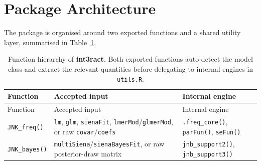 \documentclass[
  letterpaper,
  DIV=11,
  numbers=noendperiod]{scrartcl}
\begin{document}
\section{Package Architecture}\label{sec-package}

The package is organised around two exported functions and a shared
utility layer, summarised in Table~\ref{tbl-hierarchy}.

\begin{longtable}[]{@{}
  >{\raggedright\arraybackslash}p{}
  >{\raggedright\arraybackslash}p{}
  >{\raggedright\arraybackslash}p{}@{}}
\caption{Function hierarchy of \textbf{int3ract}. Both exported
functions auto-detect the model class and extract the relevant
quantities before delegating to internal engines in
\texttt{utils.R}.}\label{tbl-hierarchy}\tabularnewline
\toprule\noalign{}
\begin{minipage}[b]{\linewidth}\raggedright
Function
\end{minipage} & \begin{minipage}[b]{\linewidth}\raggedright
Accepted input
\end{minipage} & \begin{minipage}[b]{\linewidth}\raggedright
Internal engine
\end{minipage} \\
\midrule\noalign{}
\endfirsthead
\toprule\noalign{}
\begin{minipage}[b]{\linewidth}\raggedright
Function
\end{minipage} & \begin{minipage}[b]{\linewidth}\raggedright
Accepted input
\end{minipage} & \begin{minipage}[b]{\linewidth}\raggedright
Internal engine
\end{minipage} \\
\midrule\noalign{}
\endhead
\bottomrule\noalign{}
\endlastfoot
\texttt{JNK\_freq()} & \texttt{lm}, \texttt{glm}, \texttt{sienaFit},
\texttt{lmerMod}/\texttt{glmerMod}, or raw \texttt{covar}/\texttt{coefs}
& \texttt{.freq\_core()}, \texttt{parFun()}, \texttt{seFun()} \\
\texttt{JNK\_bayes()} & \texttt{multiSiena}/\texttt{sienaBayesFit}, or
raw posterior-draw matrix & \texttt{jnb\_support2()},
\texttt{jnb\_support3()} \\
\end{longtable}
\end{document}
